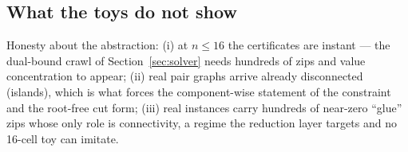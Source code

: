 \documentclass[11pt]{article}
\theoremstyle{definition}
\begin{document}
\subsection*{What the toys do not show}

Honesty about the abstraction: (i) at $n\le16$ the certificates are instant --- the
dual-bound crawl of Section~\ref{sec:solver} needs hundreds of zips and value
concentration to appear; (ii) real pair graphs arrive already disconnected (islands),
which is what forces the component-wise statement of the constraint and the root-free
cut form; (iii) real instances carry hundreds of near-zero ``glue'' zips whose only
role is connectivity, a regime the reduction layer targets and no 16-cell toy can
imitate.



\end{document}
